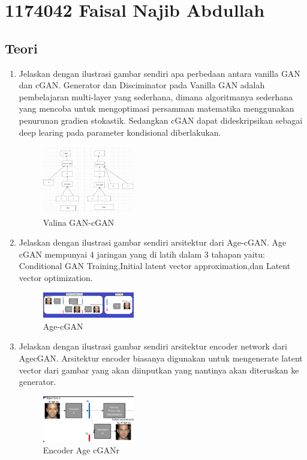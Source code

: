 \section{1174042 Faisal Najib Abdullah}

\subsection{Teori}
\begin{enumerate}

        \item Jelaskan dengan ilustrasi gambar sendiri apa perbedaan antara vanilla GAN dan cGAN.
		Generator dan Disciminator pada Vanilla GAN adalah pembelajaran multi-layer yang sederhana, dimana algoritmanya sederhana yang mencoba untuk mengoptimasi persamman matematika menggunakan penurunan gradien stokastik. Sedangkan cGAN dapat dideskripsikan sebagai deep learing pada parameter kondisional diberlakukan.
			\begin{figure}[H]
            	\includegraphics[width=4cm]{figures/1174042/chapter9/teori1.PNG}
           		\centering
           		\caption{Valina GAN-cGAN}
            \end{figure}
            
        \item Jelaskan dengan ilustrasi gambar sendiri arsitektur dari Age-cGAN.
		Age cGAN mempunyai 4 jaringan yang  di latih dalam 3 tahapan yaitu: Conditional GAN Training,Initial latent vector approximation,dan Latent vector optimization.
			\begin{figure}[H]
				\includegraphics[width=4cm]{figures/1174042/chapter9/teori2.PNG}
            		\centering
           		\caption{Age-cGAN}
            \end{figure}
                
        \item Jelaskan dengan ilustrasi gambar sendiri arsitektur encoder network dari AgecGAN.
		Arsitektur encoder biasanya digunakan untuk mengenerate latent vector dari gambar yang akan diinputkan yang nantinya akan diteruskan ke generator.
            \begin{figure}[H]
                \includegraphics[width=4cm]{figures/1174042/chapter9/teori3.PNG}
                    \centering
                \caption{Encoder Age cGANr}
            \end{figure}


\end{enumerate}
